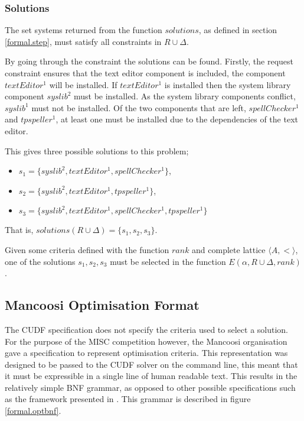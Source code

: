 \subsubsection{Solutions}
The set systems returned from the function $solutions$, as defined in section \ref{formal.step}, must satisfy all constraints in $R \cup \Delta$.

By going through the constraint the solutions can be found.
Firstly, the request constraint ensures that the text editor component is included, the component $textEditor^1$ will be installed.
If $textEditor^1$ is installed then the system library component $syslib^2$ must be installed.
As the system library components conflict, $syslib^1$ must not be installed.
Of the two components that are left, $spellChecker^1$ and $tpspeller^1$, at least one must be installed due to the dependencies of the text editor.

This gives three possible solutions to this problem;
\begin{itemize}
  \item $s_1 = \{syslib^2, textEditor^1, spellChecker^1\}$,
  \item $s_2 = \{syslib^2, textEditor^1, tpspeller^1\}$,
  \item $s_3 = \{syslib^2, textEditor^1, spellChecker^1, tpspeller^1\}$
\end{itemize}
That is, $solutions(R \cup \Delta) = \{s_1,s_2,s_3\}$.

Given some criteria defined with the function $rank$ and complete lattice $\langle A , < \rangle$, 
one of the solutions $s_1,s_2,s_3$ must be selected in the function $E(\alpha, R \cup \Delta,rank)$. 

\subsection{Mancoosi Optimisation Format}
\label{formal.mancoosioptimisationformat}
The CUDF specification does not specify the criteria used to select a solution.
For the purpose of the MISC competition however, the Mancoosi organisation gave a specification to represent optimisation criteria.
This representation was designed to be passed to the CUDF solver on the command line, this meant that it must be expressible in a single line of human readable text.
This results in the relatively simple BNF grammar, as opposed to other possible specifications such as the framework presented in \citep{treinen2009}. 
This grammar is described in figure \ref{formal.optbnf}.

